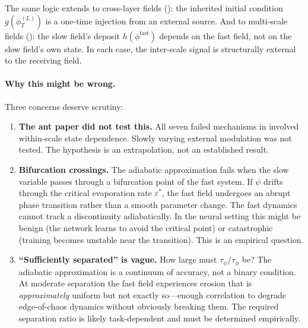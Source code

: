 \documentclass[11pt,a4paper]{article}
\newcommand{\evap}{\varepsilon}
\begin{document}
The same logic extends to cross-layer fields
(): the inherited initial condition
$g(\phi_T^{(L)})$ is a one-time injection from an external source.
And to multi-scale fields (): the slow field's
deposit $h(\phi^{\text{fast}})$ depends on the fast field, not on
the slow field's own state.  In each case, the inter-scale signal is
structurally external to the receiving field.

\paragraph{Why this might be wrong.}
Three concerns deserve scrutiny:
\begin{enumerate}
    \item \textbf{The ant paper did not test this.}  All seven failed
          mechanisms in \cite{antpaper} involved within-scale
          state dependence.  Slowly varying external modulation was
          not tested.  The hypothesis is an extrapolation, not an
          established result.

    \item \textbf{Bifurcation crossings.}  The adiabatic
          approximation fails when the slow variable passes through a
          bifurcation point of the fast system.  If $\psi$ drifts
          through the critical evaporation rate $\evap^*$, the fast
          field undergoes an abrupt phase transition rather than a
          smooth parameter change.  The fast dynamics cannot track a
          discontinuity adiabatically.  In the neural setting this
          might be benign (the network learns to avoid the critical
          point) or catastrophic (training becomes unstable near the
          transition).  This is an empirical question.

    \item \textbf{``Sufficiently separated'' is vague.}  How large
          must $\tau_\psi / \tau_\phi$ be?  The adiabatic
          approximation is a continuum of accuracy, not a binary
          condition.  At moderate separation the fast field
          experiences erosion that is \emph{approximately} uniform
          but not exactly so---enough correlation to degrade
          edge-of-chaos dynamics without obviously breaking them.
          The required separation ratio is likely task-dependent and
          must be determined empirically.
\end{enumerate}
\end{document}
